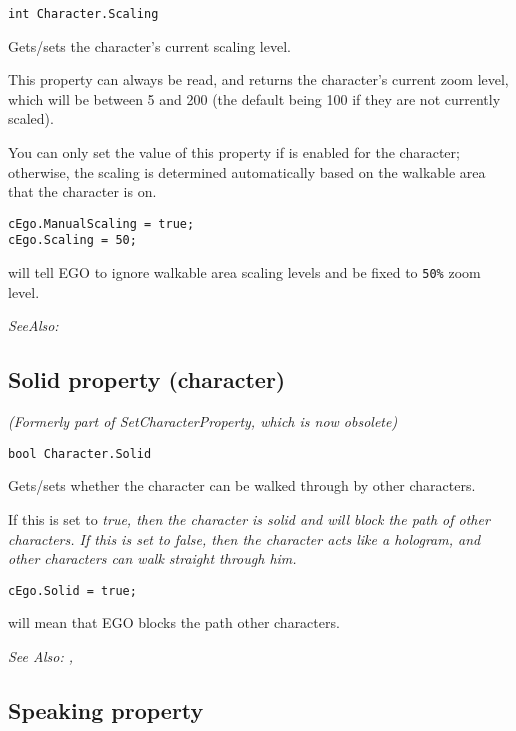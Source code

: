 \begin{verbatim}
int Character.Scaling
\end{verbatim}
Gets/sets the character's current scaling level.

This property can always be read, and returns the character's current zoom level, which
will be between 5 and 200 (the default being 100 if they are not currently scaled).

You can only set the value of this property if 
is enabled for the character; otherwise, the scaling is determined automatically based on
the walkable area that the character is on.

\begin{verbatim}
cEgo.ManualScaling = true;
cEgo.Scaling = 50;
\end{verbatim}
will tell EGO to ignore walkable area scaling levels and be fixed to \verb$50%$ zoom level.

\it{SeeAlso:} 


\subsection{Solid property (character)}\label{Character.Solid}%

\it{(Formerly part of SetCharacterProperty, which is now obsolete)}

\begin{verbatim}
bool Character.Solid
\end{verbatim}
Gets/sets whether the character can be walked through by other characters.

If this is set to \it{true}, then the character is solid and will block the path of other
characters. If this is set to \it{false}, then the character acts like a hologram, and other
characters can walk straight through him.

\begin{verbatim}
cEgo.Solid = true;
\end{verbatim}
will mean that EGO blocks the path other characters.

\it{See Also:} ,


\subsection{Speaking property}\label{Character.Speaking}%

